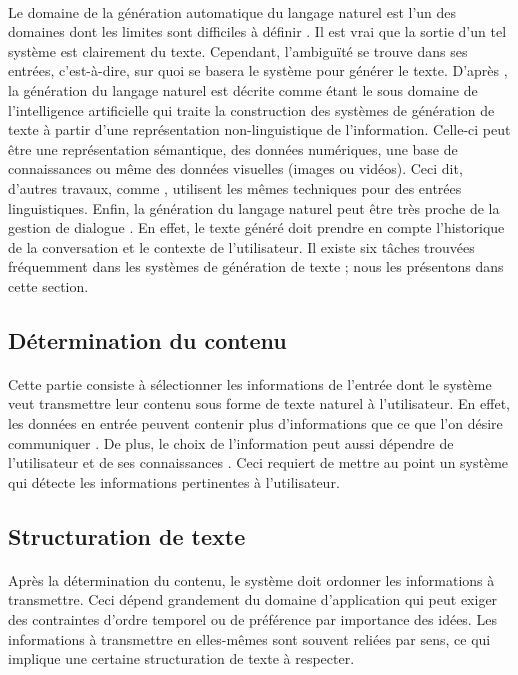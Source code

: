 \paragraph{}
Le domaine de la génération automatique du langage naturel est l'un des domaines dont les limites sont difficiles à définir \citep{evans2002}. Il est vrai que la sortie d'un tel système est clairement du texte. Cependant, l'ambiguïté se trouve dans ses entrées, c'est-à-dire, sur quoi se basera le système pour générer le texte. D'après \citep{Reiter:1997}, la génération du langage naturel est décrite comme étant le sous domaine de l'intelligence artificielle qui traite la construction des systèmes de génération de texte à partir d'une représentation non-linguistique de l'information. Celle-ci peut être une représentation sémantique, des données numériques, une base de connaissances ou même des données visuelles (images ou vidéos). Ceci dit, d'autres travaux, comme \citep{Labbé2012}, utilisent les mêmes techniques pour des entrées linguistiques. Enfin, la génération du langage naturel peut être très proche de la gestion de dialogue \citep{Dethlefs2014}. En effet, le texte généré doit prendre en compte l'historique de la conversation et le contexte de l'utilisateur.\newline
Il existe six tâches trouvées fréquemment dans les systèmes de génération de texte \citep{Reiter:1997}; nous les présentons dans cette section.

\subsection{Détermination du contenu}
\paragraph{}
Cette partie consiste à sélectionner les informations de l'entrée dont le système veut transmettre leur contenu sous forme de texte naturel à l'utilisateur. En effet, les données en entrée peuvent contenir plus d'informations que ce que l'on désire communiquer \citep{Yu:2007}. De plus, le choix de l'information peut aussi dépendre de l'utilisateur et de ses connaissances \citep{Dethlefs2014}. Ceci requiert de mettre au point un système qui détecte les informations pertinentes à l'utilisateur.
\subsection{Structuration de texte}
\paragraph{}
Après la détermination du contenu, le système doit ordonner les informations à transmettre. Ceci dépend grandement du domaine d'application qui peut exiger des contraintes d'ordre temporel ou de préférence par importance des idées. Les informations à transmettre en elles-mêmes sont souvent reliées par sens, ce qui implique une certaine structuration de texte à respecter.\newpage
